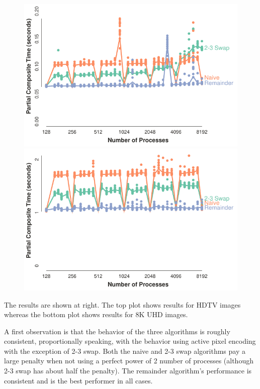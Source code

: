 \documentclass{vgtc}                          %
\newcommand*{\textalgorithm}[1]{\textsf{#1}\xspace}
\newcommand{\ttswap}{\textalgorithm{2-3 swap}}
\newcommand{\naive}{\textalgorithm{naive}}
\newcommand{\remainder}{\textalgorithm{remainder}}
\begin{document}
\begin{figure}
  \includegraphics[width=\linewidth]{no-compress-hdtv}
  \includegraphics[width=\linewidth]{no-compress-8k}
\end{figure}
The results are shown at right.
The top plot shows results for HDTV images whereas the bottom plot shows results for 8K UHD images.

A first observation is that the behavior of the three algorithms is roughly consistent, proportionally speaking, with the behavior using active pixel encoding with the exception of \ttswap.
Both the \naive and \ttswap algorithms pay a large penalty when not using a perfect power of 2 number of processes (although \ttswap has about half the penalty).
The \remainder algorithm's performance is consistent and is the best performer in all cases.
\end{document}
